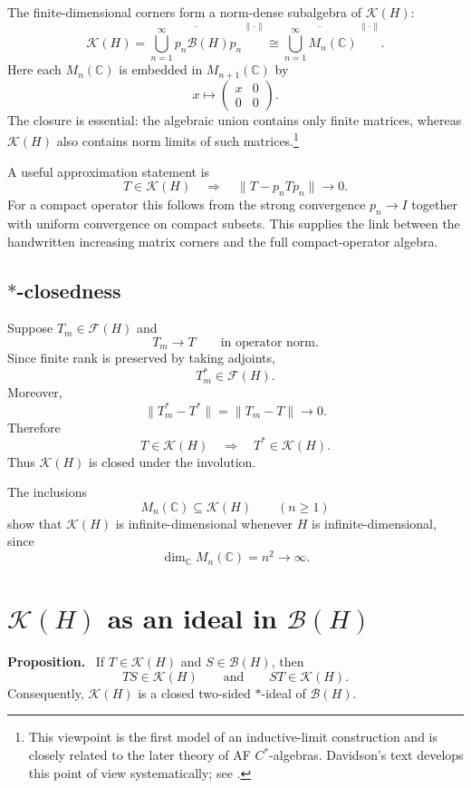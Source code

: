 \documentclass[11pt]{article}
\newcommand{\C}{\mathbb{C}}
\newcommand{\BH}{\mathcal{B}(H)}
\newcommand{\FH}{\mathcal{F}(H)}
\newcommand{\KH}{\mathcal{K}(H)}
\newenvironment{proposition}{\par\medskip\noindent\textbf{Proposition.}\ }{\par\medskip}
\begin{document}
The finite-dimensional corners form a norm-dense subalgebra of $\KH$:
\[
\boxed{
\KH
 =\overline{\bigcup_{n=1}^{\infty}p_n\BH p_n}^{\,\|\cdot\|}
 \cong
 \overline{\bigcup_{n=1}^{\infty}M_n(\C)}^{\,\|\cdot\|}.
}
\]
Here each $M_n(\C)$ is embedded in $M_{n+1}(\C)$ by
\[
x\mapsto
\begin{pmatrix}
x&0\\
0&0
\end{pmatrix}.
\]
The closure is essential: the algebraic union contains only finite matrices, whereas
$\KH$ also contains norm limits of such matrices.\footnote{This viewpoint is the
first model of an inductive-limit construction and is closely related to the later
theory of AF $C^*$-algebras.  Davidson's text develops this point of view systematically;
see \cite[Chapters I and III]{Davidson1996}.}

A useful approximation statement is
\[
T\in\KH
\quad\Longrightarrow\quad
\|T-p_nTp_n\|\longrightarrow0.
\]
For a compact operator this follows from the strong convergence $p_n\to I$ together
with uniform convergence on compact subsets.  This supplies the link between the
handwritten increasing matrix corners and the full compact-operator algebra.

\subsection{$*$-closedness}

Suppose $T_m\in\FH$ and
\[
T_m\longrightarrow T
\qquad\text{in operator norm}.
\]
Since finite rank is preserved by taking adjoints,
\[
T_m^*\in\FH.
\]
Moreover,
\[
\|T_m^*-T^*\|=\|T_m-T\|\longrightarrow0.
\]
Therefore
\[
T\in\KH\quad\Longrightarrow\quad T^*\in\KH.
\]
Thus $\KH$ is closed under the involution.

The inclusions
\[
M_n(\C)\subseteq\KH
\qquad(n\ge1)
\]
show that $\KH$ is infinite-dimensional whenever $H$ is infinite-dimensional, since
\[
\dim_{\C}M_n(\C)=n^2\longrightarrow\infty.
\]

\section{$\KH$ as an ideal in $\BH$}

\begin{proposition}
If $T\in\KH$ and $S\in\BH$, then
\[
TS\in\KH
\qquad\text{and}\qquad
ST\in\KH.
\]
Consequently, $\KH$ is a closed two-sided $*$-ideal of $\BH$.
\end{proposition}
\end{document}
